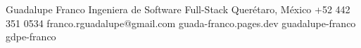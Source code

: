 \documentclass[10pt]{article}
\begin{document}
\pagestyle{empty}

\fontsize{9}{11.2}\selectfont


\makeheader
    {Guadalupe Franco}
    {Ingeniera de Software Full-Stack}
    {Querétaro, México}
    {+52 442 351 0534}
    {franco.rguadalupe@gmail.com}
    {guada-franco.pages.dev}
    {guadalupe-franco}
    {gdpe-franco}





\vspace{-2pt}






\end{document}
